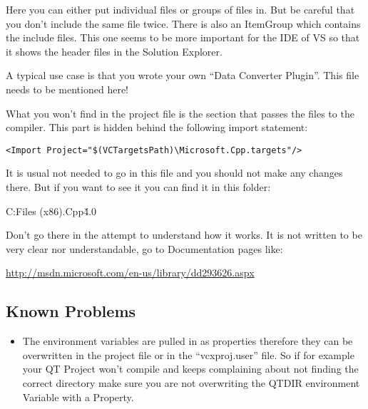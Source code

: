 Here you can either put individual files or groups of files in. But be careful that you don’t include the same file twice. There is also an ItemGroup which contains the include files. This one seems to be more important for the IDE of VS so that it shows the header files in the Solution Explorer. 

A typical use case is that you wrote your own “Data Converter Plugin”. This file needs to be mentioned here!

What you won’t find in the project file is the section that passes the files to the compiler. This part is hidden behind the following import statement:
\lstset{language=XML}
\begin{lstlisting}
<Import Project="$(VCTargetsPath)\Microsoft.Cpp.targets"/>
\end{lstlisting}

It is usual not needed to go in this file and you should not make any changes there. But if you want to see it you can find it in this folder:
\begin{listing}

C:\Program Files (x86)\MSBuild\Microsoft.Cpp\v4.0\
\end{listing}

Don’t go there in the attempt to understand how it works. It is not written to be very clear nor understandable, go to Documentation pages like:

\url{http://msdn.microsoft.com/en-us/library/dd293626.aspx}

\subsection{Known Problems}


\begin{itemize}
\item The environment variables are pulled in as properties therefore they can be overwritten in the project file or in the “vcxproj.user” file. So if for example your QT Project won’t compile and keeps complaining about not finding the correct directory make sure you are not overwriting the QTDIR environment Variable with a Property. 
\end{itemize}